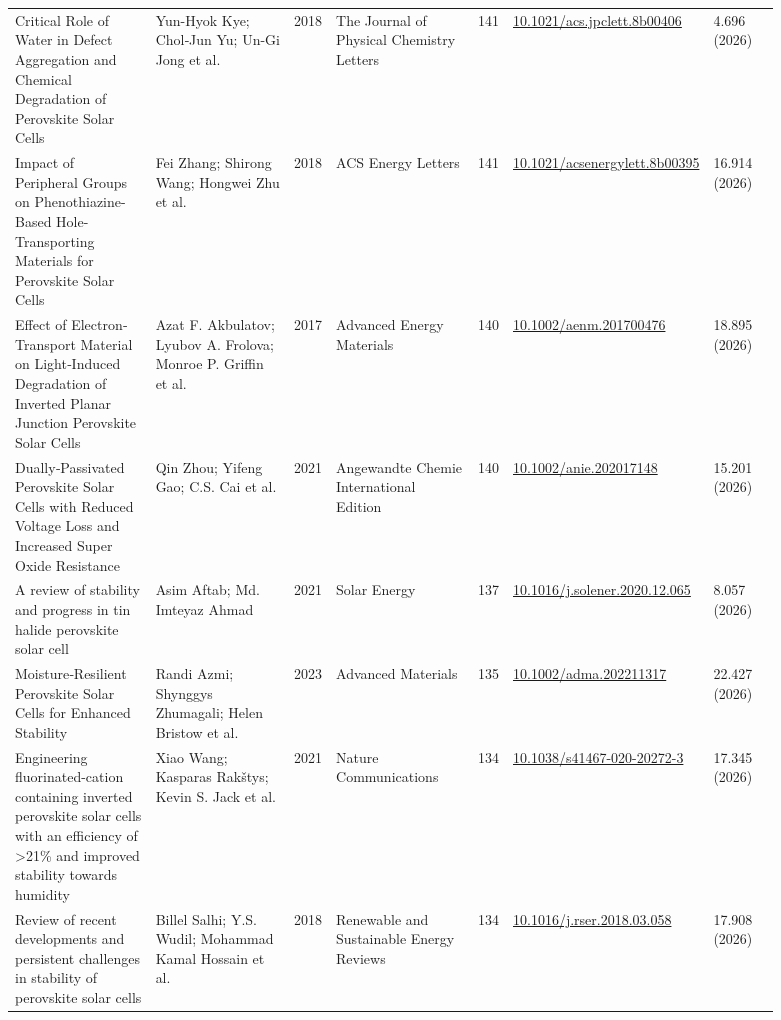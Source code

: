 \documentclass[10pt,a4paper]{article}
\begin{document}
{\begin{longtable}{p{0.197\linewidth}p{0.197\linewidth}p{0.043\linewidth}p{0.197\linewidth}p{0.043\linewidth}p{0.117\linewidth}p{0.098\linewidth}}
Critical Role of Water in Defect Aggregation and Chemical Degradation of Perovskite Solar Cells & Yun-Hyok Kye; Chol‐Jun Yu; Un-Gi Jong et al. & 2018 & The Journal of Physical Chemistry Letters & 141 & \href{https://doi.org/10.1021/acs.jpclett.8b00406}{10.1021/acs.jpclett.8b00406} & 4.696 (2026) \\
Impact of Peripheral Groups on Phenothiazine-Based Hole-Transporting Materials for Perovskite Solar Cells & Fei Zhang; Shirong Wang; Hongwei Zhu et al. & 2018 & ACS Energy Letters & 141 & \href{https://doi.org/10.1021/acsenergylett.8b00395}{10.1021/acsenergylett.8b00395} & 16.914 (2026) \\
Effect of Electron‐Transport Material on Light‐Induced Degradation of Inverted Planar Junction Perovskite Solar Cells & Azat F. Akbulatov; Lyubov A. Frolova; Monroe P. Griffin et al. & 2017 & Advanced Energy Materials & 140 & \href{https://doi.org/10.1002/aenm.201700476}{10.1002/aenm.201700476} & 18.895 (2026) \\
Dually‐Passivated Perovskite Solar Cells with Reduced Voltage Loss and Increased Super Oxide Resistance & Qin Zhou; Yifeng Gao; C.S. Cai et al. & 2021 & Angewandte Chemie International Edition & 140 & \href{https://doi.org/10.1002/anie.202017148}{10.1002/anie.202017148} & 15.201 (2026) \\
A review of stability and progress in tin halide perovskite solar cell & Asim Aftab; Md. Imteyaz Ahmad & 2021 & Solar Energy & 137 & \href{https://doi.org/10.1016/j.solener.2020.12.065}{10.1016/j.solener.2020.12.065} & 8.057 (2026) \\
Moisture‐Resilient Perovskite Solar Cells for Enhanced Stability & Randi Azmi; Shynggys Zhumagali; Helen Bristow et al. & 2023 & Advanced Materials & 135 & \href{https://doi.org/10.1002/adma.202211317}{10.1002/adma.202211317} & 22.427 (2026) \\
Engineering fluorinated-cation containing inverted perovskite solar cells with an efficiency of >21\% and improved stability towards humidity & Xiao Wang; Kasparas Rakštys; Kevin S. Jack et al. & 2021 & Nature Communications & 134 & \href{https://doi.org/10.1038/s41467-020-20272-3}{10.1038/s41467-020-20272-3} & 17.345 (2026) \\
Review of recent developments and persistent challenges in stability of perovskite solar cells & Billel Salhi; Y.S. Wudil; Mohammad Kamal Hossain et al. & 2018 & Renewable and Sustainable Energy Reviews & 134 & \href{https://doi.org/10.1016/j.rser.2018.03.058}{10.1016/j.rser.2018.03.058} & 17.908 (2026) \\

\end{longtable}}
\end{document}
